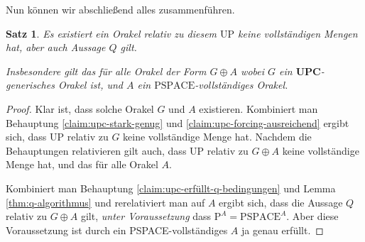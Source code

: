 \documentclass[nofonts]{uebung}
\newtheorem{theorem}{Satz}
\theoremstyle{definition}
\def\P{\ensuremath{\mathrm{P}}}
\def\UP{\ensuremath{\mathrm{UP}}}
\def\PSPACE{\ensuremath{\mathrm{PSPACE}}}
\begin{document}
Nun können wir abschließend alles zusammenführen.
\begin{theorem}
    Es existiert ein Orakel relativ zu diesem $\UP$ keine vollständigen Mengen hat, aber auch Aussage $Q$ gilt.

    Insbesondere gilt das für alle Orakel der Form $G\oplus A$ wobei $G$ ein $\mathbf{UPC}$-generisches Orakel ist, und $A$ ein $\PSPACE$-vollständiges Orakel.
\end{theorem}
\begin{proof}
    Klar ist, dass solche Orakel $G$ und $A$ existieren.
    Kombiniert man Behauptung \ref{claim:upc-stark-genug} und \ref{claim:upc-forcing-ausreichend} ergibt sich, dass $\UP$ relativ zu $G$ keine vollständige Menge hat.
    Nachdem die Behauptungen relativieren gilt auch, dass $\UP$ relativ zu $G\oplus A$ keine vollständige Menge hat, und das für alle Orakel $A$.

    Kombiniert man Behauptung \ref{claim:upc-erfüllt-q-bedingungen} und Lemma \ref{thm:q-algorithmus} und rerelativiert man auf $A$ ergibt sich, dass die Aussage $Q$ relativ zu $G\oplus A$ gilt, \emph{unter Voraussetzung} dass $\P^A=\PSPACE^A$.
    Aber diese Voraussetzung ist durch ein PSPACE-vollständiges $A$ ja genau erfüllt.
\end{proof}



\printbibliography[heading=subbibliography]

\endrefsection
\end{document}
